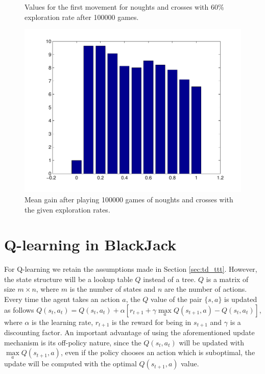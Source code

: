 \documentclass[12pt]{article}
\begin{document}
\begin{figure}[htbp!]
\begin{minipage}[t]{0.5\linewidth}
	\caption{Values for the first movement for noughts and crosses with 60\% exploration rate after 100000 games.}
	\label{fig:ttt_eps_0_6}
\end{minipage} 
\quad
\begin{minipage}[t]{0.45\linewidth}
	\includegraphics[scale=0.40]{images/tttExpectedGain}
	\caption{Mean gain after playing 100000 games of noughts and crosses with the given exploration rates.}
	\label{fig:tttExpectedGain}
\end{minipage}
\end{figure}

\section{Q-learning in BlackJack}

For Q-learning\cite{Sutton1998} we retain the assumptions made in Section \ref{sec:td_ttt}.
However, the state structure will be a lookup table $Q$ instead of a tree.
$Q$ is a matrix of size $m \times n$, where $m$ is the number of states and $n$ are the number of actions.
Every time the agent takes an action $a$, the $Q$ value of the pair $\lbrace s, a \rbrace$ is updated as follows $Q(s_t,a_t) = Q(s_t,a_t) + \alpha \left[ r_{t+1} + \gamma \max\limits_a Q(s_{t+1},a) - Q(s_t,a_t) \right]$, where $\alpha$ is the learning rate, $r_{t+1}$ is the reward for being in $s_{t+1}$ and $\gamma$ is a discounting factor.
An important advantage of using the aforementioned update mechanism is its off-policy nature, since the $Q(s_t,a_t)$ will be updated with $\max\limits_a Q(s_{t+1},a)$, even if the policy chooses an action which is suboptimal, the update will be computed with the optimal $Q(s_{t+1},a)$ value.
\end{document}
